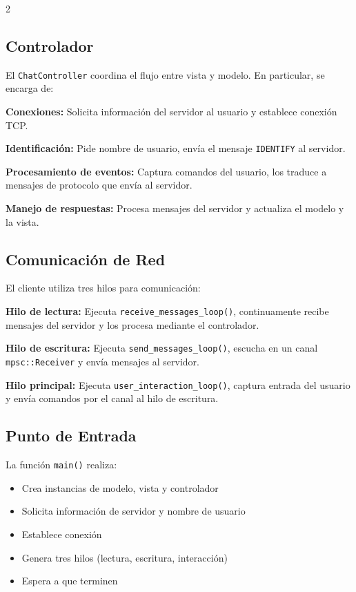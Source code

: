 \documentclass[letter,11pt]{article}
\begin{document}
\begin{multicols}{2}
\subsection{Controlador}

El \texttt{ChatController} coordina el flujo entre vista y modelo. En particular, se encarga de:

\textbf{Conexiones:} Solicita información del servidor al usuario y establece conexión TCP.

\textbf{Identificación:} Pide nombre de usuario, envía el mensaje \texttt{IDENTIFY} al servidor.

\textbf{Procesamiento de eventos:} Captura comandos del usuario, los traduce a mensajes de protocolo que envía al servidor.

\textbf{Manejo de respuestas:} Procesa mensajes del servidor y actualiza el modelo y la vista.

\subsection{Comunicación de Red}

El cliente utiliza tres hilos para comunicación:

\textbf{Hilo de lectura:} Ejecuta \texttt{receive\_messages\_loop()}, continuamente recibe mensajes del servidor y los procesa mediante el controlador.

\textbf{Hilo de escritura:} Ejecuta \texttt{send\_messages\_loop()}, escucha en un canal \texttt{mpsc::Receiver} y envía mensajes al servidor.

\textbf{Hilo principal:} Ejecuta \texttt{user\_interaction\_loop()}, captura entrada del usuario y envía comandos por el canal al hilo de escritura.

\subsection{Punto de Entrada}

La función \texttt{main()} realiza:

\begin{itemize}
    \item Crea instancias de modelo, vista y controlador
    \item Solicita información de servidor y nombre de usuario
    \item Establece conexión
    \item Genera tres hilos (lectura, escritura, interacción)
    \item Espera a que terminen
\end{itemize}


\end{multicols}
\end{document}
